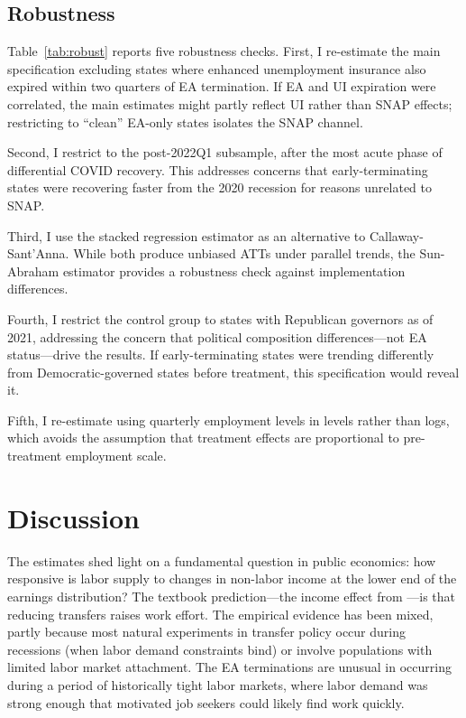 \documentclass[12pt]{article}
\begin{document}
\subsection{Robustness}



Table~\ref{tab:robust} reports five robustness checks. First, I re-estimate the main specification excluding states where enhanced unemployment insurance also expired within two quarters of EA termination. If EA and UI expiration were correlated, the main estimates might partly reflect UI rather than SNAP effects; restricting to ``clean'' EA-only states isolates the SNAP channel.

Second, I restrict to the post-2022Q1 subsample, after the most acute phase of differential COVID recovery. This addresses concerns that early-terminating states were recovering faster from the 2020 recession for reasons unrelated to SNAP.

Third, I use the \citet{sun2021estimating} stacked regression estimator as an alternative to Callaway-Sant'Anna. While both produce unbiased ATTs under parallel trends, the Sun-Abraham estimator provides a robustness check against implementation differences.

Fourth, I restrict the control group to states with Republican governors as of 2021, addressing the concern that political composition differences---not EA status---drive the results. If early-terminating states were trending differently from Democratic-governed states before treatment, this specification would reveal it.

Fifth, I re-estimate using quarterly employment levels in levels rather than logs, which avoids the assumption that treatment effects are proportional to pre-treatment employment scale.

\section{Discussion}

The estimates shed light on a fundamental question in public economics: how responsive is labor supply to changes in non-labor income at the lower end of the earnings distribution? The textbook prediction---the income effect from \citet{moffitt2002welfare}---is that reducing transfers raises work effort. The empirical evidence has been mixed, partly because most natural experiments in transfer policy occur during recessions (when labor demand constraints bind) or involve populations with limited labor market attachment. The EA terminations are unusual in occurring during a period of historically tight labor markets, where labor demand was strong enough that motivated job seekers could likely find work quickly.
\end{document}
